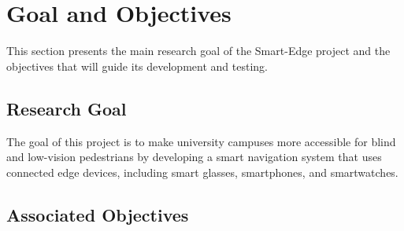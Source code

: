 \documentclass[12pt,letterpaper,oneside,reqno]{book}
\theoremstyle{plain}
\theoremstyle{definition}
\theoremstyle{plain}
\theoremstyle{remark}
\theoremstyle{plain}
\theoremstyle{definition}
\theoremstyle{plain}
\begin{document}
\section{Goal and Objectives}
This section presents the main research goal of the Smart-Edge project and the objectives that will guide its development and testing.

\subsection{Research Goal}
The goal of this project is to make university campuses more accessible for blind and low-vision pedestrians by developing a smart navigation system that uses connected edge devices, including smart glasses, smartphones, and smartwatches.

\subsection{Associated Objectives}
\end{document}
